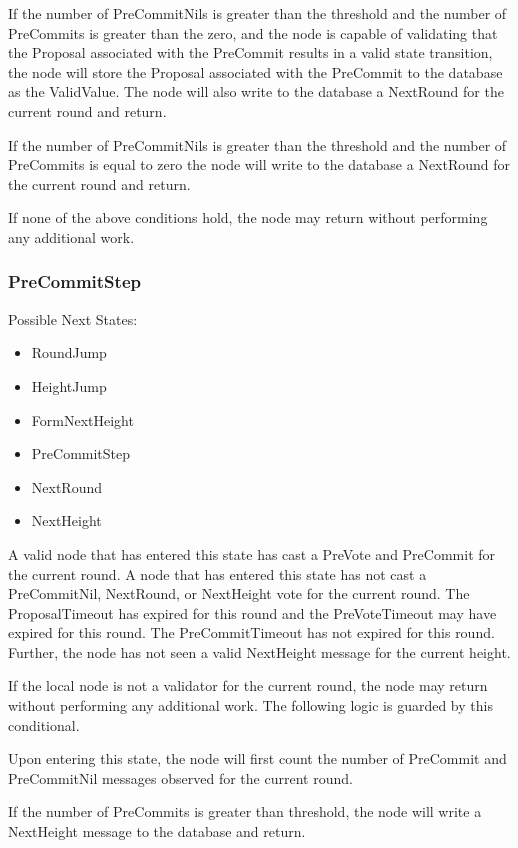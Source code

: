 If the number of PreCommitNils is greater than the threshold and the
number of PreCommits is greater than the zero, and the node is capable
of validating that the Proposal associated with the PreCommit results
in a valid state transition, the node will store the Proposal
associated with the PreCommit to the database as the ValidValue.
The node will also write to the database a NextRound for the current
round and return.

If the number of PreCommitNils is greater than the threshold and the
number of PreCommits is equal to zero the node will write to the
database a NextRound for the current round and return.

If none of the above conditions hold, the node may return without
performing any additional work.


\subsubsection{PreCommitStep}

Possible Next States:

\begin{itemize}
    \item RoundJump
    \item HeightJump
    \item FormNextHeight
    \item PreCommitStep
    \item NextRound
    \item NextHeight
\end{itemize}

A valid node that has entered this state has cast a PreVote and
PreCommit for the current round.
A node that has entered this state has not cast a PreCommitNil,
NextRound, or NextHeight vote for the current round.
The ProposalTimeout has expired for this round and the PreVoteTimeout
may have expired for this round.
The PreCommitTimeout has not expired for this round.
Further, the node has not seen a valid NextHeight message for the
current height.

If the local node is not a validator for the current round, the node
may return without performing any additional work.
The following logic is guarded by this conditional.

Upon entering this state, the node will first count the number of
PreCommit and PreCommitNil messages observed for the current round.

If the number of PreCommits is greater than threshold, the node will
write a NextHeight message to the database and return.

